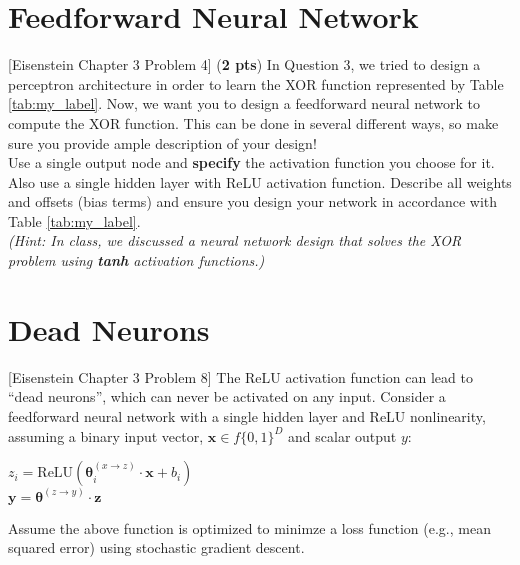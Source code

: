 \documentclass[11pt, letterpaper]{article}
\begin{document}
\bigskip

\newpage
\section{Feedforward Neural Network}
    
    [Eisenstein Chapter 3 Problem 4] (\textbf{2 pts}) In Question 3, we tried to design a perceptron architecture in order to learn the XOR function represented by Table \ref{tab:my_label}. Now, we want you to design a feedforward neural network to compute the XOR function. This can be done in several different ways, so make sure you provide ample description of your design!\\
    
    \noindent Use a single output node and \textbf{specify} the activation function you choose for it. Also use a single hidden layer with ReLU activation function.  Describe all weights and offsets (bias terms) and ensure you design your network in accordance with Table \ref{tab:my_label}.\\
    
    \noindent \textit{(Hint: In class, we discussed a neural network design that solves the XOR problem using \textbf{tanh} activation functions.)}
    
    \newpage
    \section{Dead Neurons}
        
    [Eisenstein Chapter 3 Problem 8] The ReLU activation function can lead to ``dead neurons'', which can never be activated on any input. Consider a feedforward neural network with a single hidden layer and ReLU nonlinearity, assuming a binary input vector, $\mathbf{x} \in f\{0,1\}^D$  and scalar output $y$:
    \begin{center}
    $z_i = \text{ReLU}(\mathbf{\theta}_i^{(x \rightarrow z)} \cdot \mathbf{x} + b_i)$ \\
    $\mathbf{y} = \mathbf{\theta}^{(z \rightarrow y)} \cdot \mathbf{z}$
    \end{center}
    
    Assume the above function is optimized to minimze a loss function (e.g., mean squared error) using stochastic gradient descent. 
    
\end{document}
